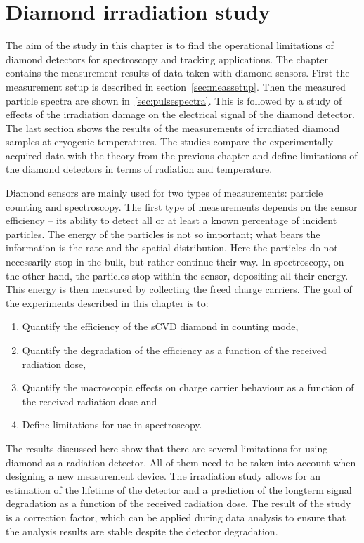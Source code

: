  
\chapter{Diamond irradiation study}%
\label{ch:meas}


The aim of the study in this chapter is to find the operational limitations of diamond detectors for spectroscopy and tracking applications. The chapter contains the measurement results of data taken with diamond sensors. First the measurement setup is described in section~\ref{sec:meassetup}. Then the measured particle spectra are shown in~\ref{sec:pulsespectra}. This is followed by a study of effects of the irradiation damage on the electrical signal of the diamond detector. The last section shows the results of the measurements of irradiated diamond samples at cryogenic temperatures. The studies compare the experimentally acquired data with the theory from the previous chapter and define limitations of the diamond detectors in terms of radiation and temperature.

Diamond sensors are mainly used for two types of measurements: particle counting and spectroscopy. The first type of measurements depends on the sensor efficiency -- its ability to detect all or at least a known percentage of incident particles. The energy of the particles is not so important; what bears the information is the rate and the spatial distribution. Here the particles do not necessarily stop in the bulk, but rather continue their way. In spectroscopy, on the other hand, the particles stop within the sensor, depositing all their energy. This energy is then measured by collecting the freed charge carriers. The goal of the experiments described in this chapter is to:
\begin{enumerate}[itemsep=0.1\baselineskip]
\item Quantify the efficiency of the sCVD diamond in counting mode, 
\item Quantify the degradation of the efficiency as a function of the received radiation dose,
\item Quantify the macroscopic effects on charge carrier behaviour as a function of the received radiation dose and 
\item Define limitations for use in spectroscopy.
\end{enumerate}
The results discussed here show that there are several limitations for using diamond as a radiation detector. All of them need to be taken into account when designing a new measurement device. The irradiation study allows for an estimation of the lifetime of the detector and a prediction of the longterm signal degradation as a function of the received radiation dose. The result of the study is a correction factor, which can be applied during data analysis to ensure that the analysis results are stable despite the detector degradation.


